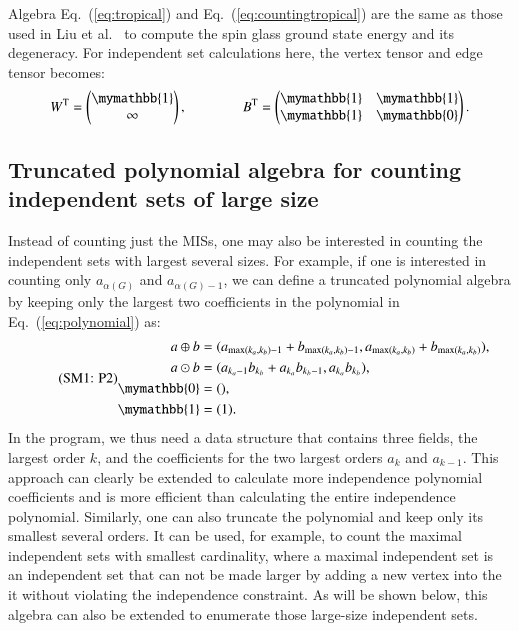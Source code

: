 \documentclass[onefignum, onetabnum]{siamart190516}
\newcommand{\eqname}[1]{\stepcounter{equation}\tag{\theequation : #1}}
\newcommand{\<}{\langle}
\renewcommand{\>}{\rangle}
\newcommand{\Eq}[1]{Eq.~(\ref{#1})}
\newcounter{example}
\begin{document}
Algebra \Eq{eq:tropical} and \Eq{eq:countingtropical} are the same as those used in Liu et al.~\cite{Liu2021} to compute the spin glass ground state energy and its degeneracy.
For independent set calculations here, the vertex tensor and edge tensor becomes:
\begin{equation}
    W^{\rm T} = \left(\begin{matrix}
        \mymathbb{1} \\
        \infty
    \end{matrix}\right),   
    \qquad \qquad
        B^{\rm T} = \left(\begin{matrix}
        \mymathbb{1}  & \mymathbb{1} \\
        \mymathbb{1} & \mymathbb{0}
    \end{matrix}\right).
\end{equation}

\subsection{Truncated polynomial algebra for counting independent sets of large size}
Instead of counting just the MISs, one may also be interested in counting the independent sets with largest several sizes.
For example, if one is interested in counting only $a_{\alpha(G)}$ and $a_{\alpha(G)-1}$, we can define a truncated polynomial algebra by keeping only the largest two coefficients in the polynomial in \Eq{eq:polynomial} as:
\begin{equation}
    \eqname{P2}
    \begin{split}
    a \oplus b &= (a_{\max(k_a, k_b)-1} + b_{\max(k_a, k_b)-1}, a_{\max(k_a, k_b)} + b_{\max(k_a, k_b)}),\\
    a \odot b &= (a_{k_a-1} b_{k_b}+a_{k_a} b_{k_b-1}, a_{k_a} b_{k_b}),\\
    \mymathbb{0} &= (), \\
    \mymathbb{1} &= (1).\label{eq:max2poly}
    \end{split}
\end{equation}
In the program, we thus need a data structure that contains three fields, the largest order $k$, and the coefficients for the two largest orders $a_k$ and $a_{k-1}$.
This approach can clearly be extended to calculate more independence polynomial coefficients and is more efficient than calculating the entire independence polynomial.
Similarly, one can also truncate the polynomial and keep only its smallest several orders.
It can be used, for example, to count the maximal independent sets with smallest cardinality, where a maximal independent set is an independent set that can not be made larger by adding a new vertex into the it without violating the independence constraint.
As will be shown below, this algebra can also be extended to enumerate those large-size independent sets.
\end{document}
